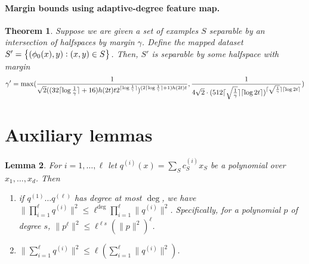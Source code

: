 \documentclass{article}
\DeclarePairedDelimiter\ceil{\lceil}{\rceil}
\newtheorem{theorem}{Theorem}
\newtheorem{lemma}[theorem]{Lemma}
\begin{document}
\paragraph{Margin bounds using adaptive-degree feature map.}
\begin{theorem}
Suppose we are given a set of examples $S$ separable by an intersection of halfspaces by margin $\gamma$. Define the mapped dataset $S'=\cbr{(\phi_0(x),y): (x,y) \in S}$. Then, $S'$ is separable by some halfspace with margin
\[
\gamma' =
\max(
\frac{1}{ \sqrt{2} ( (32 \ceil{\log \frac 1 \gamma} + 16 ) h(2t) t 2^{\ceil{\log \frac 1 \gamma}})^{(2\ceil{\log \frac 1 \gamma} + 1 ) h(2t) t} },
\frac{1}{4 \sqrt{2} \cdot (512 \ceil{\sqrt{\frac1\gamma}} \ceil{\log 2t})^{\ceil{\sqrt{\frac1\gamma}} \ceil{\log 2t}}}
)
\]
\end{theorem}




\section{Auxiliary lemmas}
\begin{lemma}
   For $i=1,\ldots, \ell$ let $q^{(i)}(x)=\sum_S c^{(i)}_{S} x_S $ be a polynomial over $x_1, \ldots, x_d$. Then
   \begin{enumerate}
     \item if $q^{(1)}\ldots q^{(\ell)}$ has degree at most $\deg$, we have $\|\prod_{i=1}^{\ell} q^{(i)}\|^2 \leq \ell^{\deg} \prod_{i=1}^{\ell} \|q^{(i)}\|^2$. Specifically, for a polynomial $p$ of degree $s$, $\|p^\ell \|^2 \leq  \ell^{\ell s} (\|p\|^2)^\ell$.
     \item $\|\sum_{i=1}^{\ell} q^{(i)}\|^2 \leq \ell(\sum_{i=1}^{\ell} \|q^{(i)}\|^2)$.
   \end{enumerate}
   \label{lem:norm-oper}
\end{lemma}



\newpage


\end{document}
